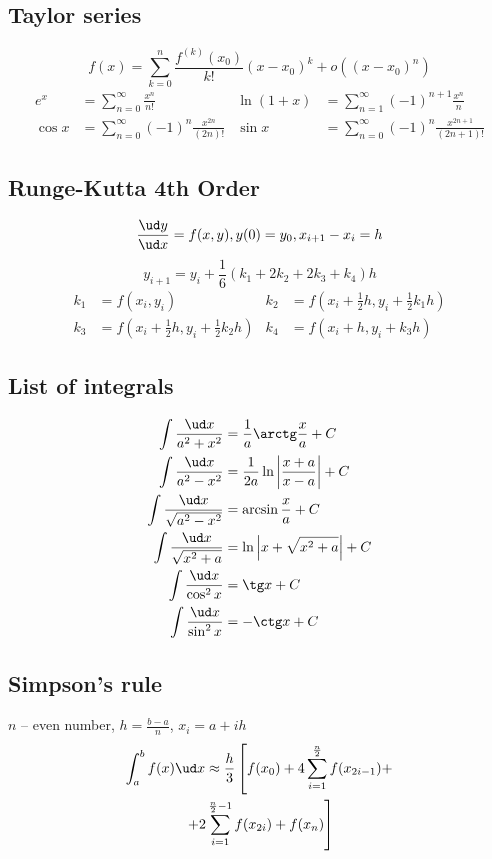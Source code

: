 \subsection*{Taylor series}
$$f(x) = \sum_{k=0}^n \frac{f^{(k)}(x_0)}{k!} (x-x_0)^k + o((x-x_0)^n)$$
\begin{align*}
e^x &= \sum_{n=0}^\infty \frac{x^n}{n!} &
\ln (1 + x) &= \sum_{n = 1}^\infty (-1)^{n + 1} \frac{x^n}{n} \\
\cos x &= \sum_{n=0}^\infty (-1)^n \frac{x^{2n}}{(2n)!} &
\sin x &= \sum_{n=0}^\infty (-1)^n \frac{x^{2n + 1}}{(2n + 1)!}
\end{align*}

\subsection*{Runge-Kutta 4th Order}
$$\frac{\ud y}{\ud x} = f(x, y), y(0) = y_0, x_{i + 1} - x_i = h$$
$$y_{i + 1} = y_i + \frac{1}{6}(k_1 + 2 k_2 + 2 k_3 + k_4) h$$
\begin{align*}
k_1 &= f(x_i, y_i) & k_2 &= f(x_i + \frac{1}{2} h, y_i + \frac{1}{2} k_1 h) \\
k_3 &= f(x_i + \frac{1}{2} h, y_i + \frac{1}{2} k_2 h) & k_4 &= f(x_i + h, y_i + k_3 h)
\end{align*}

\subsection*{List of integrals}
\begin{align*}
\int \frac{\ud x}{a^2 + x^2} &= \frac{1}{a} \arctg \frac{x}{a} + C \\
\int \frac{\ud x}{a^2 - x^2} &= \frac{1}{2a} \ln \left\lvert \frac{x + a}{x - a} \right\rvert + C \\
\int \frac{\ud x}{\sqrt{a^2 - x^2}} &= \arcsin \frac{x}{a} + C \\
\int \frac{\ud x}{\sqrt{x^2 + a}} &= \ln \left\lvert x + \sqrt{x^2 + a} \right\rvert + C \\
\int \frac{\ud x}{\cos^2 x} &= \tg x + C \\
\int \frac{\ud x}{\sin^2 x} &= -\ctg x + C
\end{align*}

\subsection*{Simpson's rule}
$n$ -- even number, $h = \frac{b - a}{n}$, $x_i = a + i h$
\begin{multline*}
\int_a^b f(x) \ud x \approx \frac{h}{3} \left[f(x_0) + 4 \sum_{i = 1}^{\frac{n}{2}} f(x_{2 i - 1}) + \right. \\
\left. + 2 \sum_{i = 1}^{\frac{n}{2} - 1} f(x_{2 i}) + f(x_n) \right]
\end{multline*}

